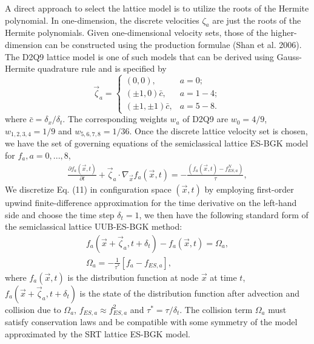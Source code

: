 \documentclass[doublecol]{epl2}
\begin{document}
A direct approach to select the lattice model is to utilize the roots of the Hermite polynomial. In one-dimension, the discrete velocities $\zeta_a$ are just the roots of the Hermite polynomials.  Given one-dimensional velocity sets, those of the higher-dimension can be constructed using the production formulae (Shan et al. 2006).  The D2Q9 lattice model is one of such models that can be derived using Gauss-Hermite quadrature rule and is specified by
\begin{equation}
\vec \zeta_a =
  \begin{cases}
   (0, 0), & a =0; \\
   (\pm 1, 0) \bar{c}, &  a=1-4; \\
   (\pm 1, \pm 1) \bar{c}, & a=5-8.
  \end{cases}
\end{equation}
where $\bar{c} = \delta_x/\delta_t$. The corresponding weights $w_a$ of D2Q9 are $w_0=4/9$, $w_{1,2,3,4}=1/9$ and $w_{5,6,7,8}=1/36$.
Once the discrete lattice velocity set is chosen, we have the set of governing equations of the semiclassical lattice ES-BGK model for $f_a, a=0, ..., 8$,
\begin{align}
\frac{\partial f_a (\vec x, t)}{\partial t} + \vec \zeta_a \cdot
\nabla_{\vec x} f_a( \vec x, t) =  -\frac{(f_a(\vec x, t) - f^{N}_{ES,a})}{\tau},
\end{align}
We discretize Eq. (11) in configuration space $(\vec x,t)$ by employing first-order upwind finite-difference approximation for
the time derivative on the left-hand side and choose the time step $\delta_t = 1$, we then have the following standard form of the
semiclassical lattice UUB-ES-BGK method:
\begin{align}
f_a(\vec x+ \vec \zeta_a, t+\delta_t)- f_a(\vec x,t)=\Omega_a,\nonumber \\
\Omega_a = -\frac{1}{\tau^*}[f_a - f_{ES,a}],
\end{align}
where $f_a(\vec x,t)$ is the distribution function at node $\vec x$ at time $t$, $f_a(\vec x+ \vec \zeta_a, t+\delta_t)$ is the state of the distribution function after advection and collision due to $\Omega_a$, $f_{ES,a} \approx f_{ES,a}^{2}$ and $\tau^*= \tau/\delta_t$.  The collision term $\Omega_a$ must satisfy conservation laws and be compatible with some symmetry of the model approximated by the SRT lattice ES-BGK model.
\end{document}
